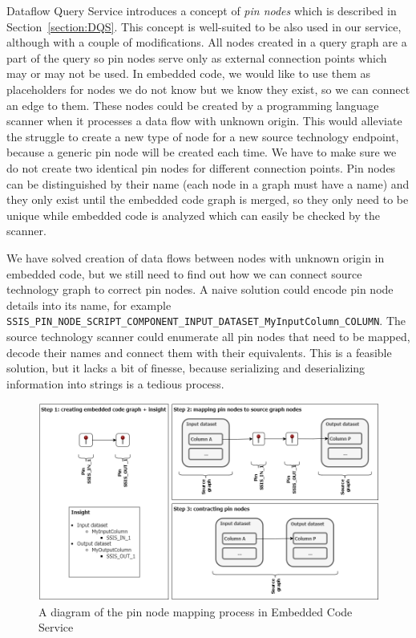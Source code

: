 Dataflow Query Service introduces a concept of \textit{pin nodes} which is described in Section~\ref{section:DQS}. This concept is well-suited to be also used in our service, although with a couple of modifications. All nodes created in a query graph are a part of the query so pin nodes serve only as external connection points which may or may not be used. In embedded code, we would like to use them as placeholders for nodes we do not know but we know they exist, so we can connect an edge to them. These nodes could be created by a programming language scanner when it processes a data flow with unknown origin. This would alleviate the struggle to create a new type of node for a new source technology endpoint, because a generic pin node will be created each time. We have to make sure we do not create two identical pin nodes for different connection points. Pin nodes can be distinguished by their name (each node in a graph must have a name) and they only exist until the embedded code graph is merged, so they only need to be unique while embedded code is analyzed which can easily be checked by the scanner.
\par
We have solved creation of data flows between nodes with unknown origin in embedded code, but we still need to find out how we can connect source technology graph to correct pin nodes. A naive solution could encode pin node details into its name, for example \texttt{SSIS\_PIN\_NODE\_SCRIPT\_COMPONENT\_INPUT\_DATASET\_MyInputColumn\_COLUMN}. The source technology scanner could enumerate all pin nodes that need to be mapped, decode their names and connect them with their equivalents. This is a feasible solution, but it lacks a bit of finesse, because serializing and deserializing information into strings is a tedious process.
\begin{figure}[ht]\centering
\includegraphics[width=1.0\textwidth]{img/pin_nodes_ecs.png}
\caption{A diagram of the pin node mapping process in Embedded Code Service}
\label{fig:pinNodesECS}
\end{figure} 
